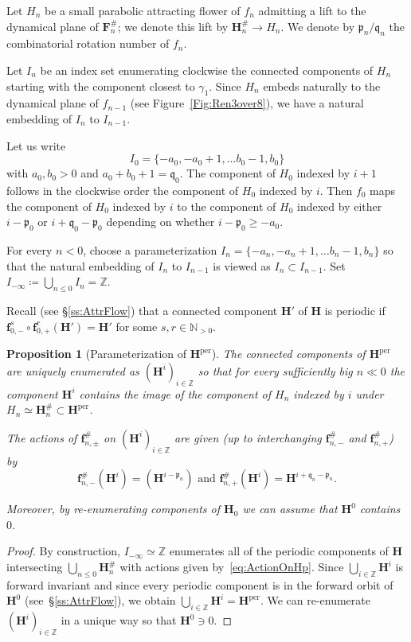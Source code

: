 \documentclass[]{amsart}
\newcommand{\bF}{{\mathbf F}}
\newcommand{\bH}{{\mathbf H}}
\newcommand{\bbf}{{\mathbf f}}
\newcommand{\pp}{\mathfrak{p}}
\renewcommand{\qq}{\mathfrak{q}}
\newcommand{\N}{\mathbb{N}}
\newcommand{\Z}{\mathbb{Z}}
\newtheorem{prop}[thm]{Proposition}
\theoremstyle{remark}
\numberwithin{equation}{section}
\theoremstyle{definition}
\newcommand{\per}{{\mathrm{per}}}
\begin{document}
 
 



Let $H_{n}$ be a small parabolic attracting flower of $f_n$ admitting a lift to the dynamical plane of $\bF_{n}^{\#}$; we denote this lift by $\bH^\#_{n}\to H_{n}$. We denote by $\pp_n/\qq_n$ the combinatorial rotation number of $f_n$. 



Let $I_n$ be an index set enumerating clockwise the connected components of $H_{n}$ starting with the component closest to $\gamma_1$. Since $H_{n}$ embeds naturally to the dynamical plane of $f_{n-1}$ (see Figure~\ref{Fig:Ren3over8}), we have a natural embedding of $I_n$ to $ I_{n-1}$.

Let us write 
\[I_0=\{-a_0,-a_0+1 , \dots b_0-1, b_0\}\]
with $a_0,b_0>0$ and $a_0+b_0+1=\qq_0$. The component of $H_{0}$ indexed by $i+1$ follows in the clockwise order the  component of $H_{0}$ indexed by $i$.
Then $f_0$ maps the component of $H_{0}$ indexed by $i$ to the component of $H_{0}$ indexed by either $i-\pp_0$ or $i+\qq_0-\pp_0$ depending on whether $i-\pp_0\ge -a_0$.


For every $n<0$, choose a parameterization  $I_n=\{-a_n,-a_n+1 , \dots b_n-1, b_n\}$ so that the natural embedding of $I_{n}$ to $I_{n-1}$ is viewed as $I_{n}\subset I_{n-1}$. Set $I_{-\infty}\coloneqq \bigcup_{n\le 0} I_n=\Z$.

Recall (see \S\ref{ss:AttrFlow}) that a connected component $\bH'$ of $\bH$ is periodic if $\bbf_{0,-}^s\circ \bbf_{0,+}^r(\bH')=\bH'$ for some $s,r\in \N_{> 0}$.
\begin{prop}[Parameterization of $\bH^\per$]
\label{prop:ClassOfPerComp}
The connected components of $\bH^\per$ are uniquely enumerated as $(\bH^i)_{i\in \Z}$ so that for every sufficiently big $n\ll0$ the component $\bH^i$ contains the image of the component of $H_{n}$ indexed by $i$ under $H_{n}\simeq \bH_{n}^{\#}\subset \bH^\per$.

The actions of $\bbf^{\#}_{n,\pm}$ on $(\bH^i)_{i\in \Z}$ are given (up to interchanging $\bbf^{\#}_{n,-}$ and $\bbf^{\#}_{n,+}$) by
\begin{equation}
\label{eq:ActionOnHp}
 \bbf^{\#}_{n,-}(\bH^i) = ( \bH^{i-\pp_n}) \text{ and } \bbf^{\#}_{n,+}(\bH^i) = \bH^{i+\qq_n-\pp_n}.
\end{equation}

Moreover, by re-enumerating components of $\bH_0$ we can assume that $\bH^0$ contains $0$.
\end{prop}
\begin{proof} 
By construction, $I_{-\infty}  \simeq \Z$ enumerates all of the periodic components of $\bH$ intersecting $\bigcup_{n\le 0}\bH_{n}^{\#}$ with actions given by~\eqref{eq:ActionOnHp}. Since $\displaystyle\bigcup_{i\in \Z} \bH^i$ is forward invariant and since every periodic component is in the forward orbit of $\bH^0$  (see~\S\ref{ss:AttrFlow}), we obtain  $\displaystyle\bigcup_{i\in \Z} \bH^i= \bH^\per$. We can re-enumerate $(\bH^i)_{i\in \Z}$ in a unique way so that $\bH^0\ni 0$.
 \end{proof}
\end{document}
